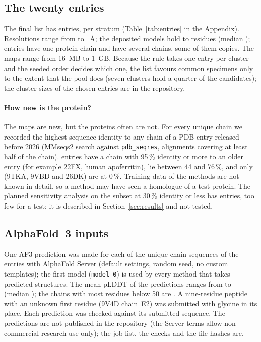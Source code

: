 \subsection{The twenty entries}
The final list has \NEntries{} entries, \SelLow{} per stratum (Table~\ref{tab:entries} in the Appendix). Resolutions range from \ResMin{} to \ResMax{}~\AA{}; the deposited models hold \ResiduesMin{} to \ResiduesMax{} residues (median \ResiduesMedian{}); \NSingleChain{} entries have one protein chain and \NMultiChain{} have several chains, some of them copies. The maps range from 16~MB to 1~GB. Because the rule takes one entry per cluster and the seeded order decides which one, the list favours common specimens only to the extent that the pool does (seven clusters hold a quarter of the candidates); the cluster sizes of the chosen entries are in the repository.

\paragraph{How new is the protein?}
The maps are new, but the proteins often are not. For every unique chain we recorded the highest sequence identity to any chain of a PDB entry released before 2026 (MMseqs2 search against \texttt{pdb\_seqres}, alignments covering at least half of the chain). \NIdentHigh{} entries have a chain with 95\,\% identity or more to an older entry (for example 22FX, human apoferritin), \NIdentMid{} lie between 44 and 76\,\%, and only \NIdentLow{} (9TKA, 9VBD and 26DK) are at 0\,\%. Training data of the methods are not known in detail, so a method may have seen a homologue of a test protein. The planned sensitivity analysis on the subset at 30\,\% identity or less has \NIdentLow{} entries, too few for a test; it is described in Section~\ref{sec:results} and not tested.

\subsection{AlphaFold~3 inputs}
One AF3 prediction was made for each of the \AfChains{} unique chain sequences of the \NEntries{} entries with AlphaFold Server (default settings, random seed, no custom templates); the first model (\texttt{model\_0}) is used by every method that takes predicted structures. The mean pLDDT of the predictions ranges from \AfPlddtMin{} to \AfPlddtMax{} (median \AfPlddtMed{}); the chains with most residues below 50 are \AfLowList{}. A nine-residue peptide with an unknown first residue (9V4D chain~E2) was submitted with glycine in its place. Each prediction was checked against its submitted sequence. The predictions are not published in the repository (the Server terms allow non-commercial research use only); the job list, the checks and the file hashes are.
